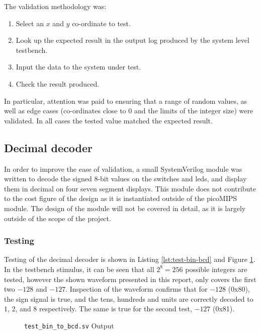 The validation methodology was:
\begin{enumerate}
	 \item Select an $x$ and $y$ co-ordinate to test.
	 \item Look up the expected result in the output log produced by the system level testbench.
	 \item Input the data to the system under test.
	 \item Check the result produced.
\end{enumerate}
In particular, attention was paid to ensuring that a range of random values, as well as edge cases (co-ordinates close to $0$ and the limits of the integer size) were validated. In all cases the tested value matched the expected result.


\subsection{Decimal decoder}
In order to improve the ease of validation, a small SystemVerilog module was written to decode the signed 8-bit values on the switches and \glspl{led}, and display them in decimal on four seven segment displays. This module does not contribute to the cost figure of the design as it is instantiated outside of the picoMIPS module. The design of the module will not be covered in detail, as it is largely outside of the scope of the project.

\subsubsection{Testing}
Testing of the decimal decoder is shown in Listing \ref{lst:test-bin-bcd} and Figure \ref{fig:test-bin-bcd}. In the testbench stimulus, it can be seen that all $2^8 = 256$ possible integers are tested, however the shown waveform presented in this report, only covers the first two $-128$ and $-127$. Inspection of the waveform confirms that for $-128$ (0x80), the sign signal is true, and the tens, hundreds and units are correctly decoded to $1$, $2$, and $8$ respectively. The same is true for the second test, $-127$ (0x81).



\begin{figure}[ht]
	\centering
	
	\caption{\texttt{test\_bin\_to\_bcd.sv} Output}
	\label{fig:test-bin-bcd}
\end{figure}

